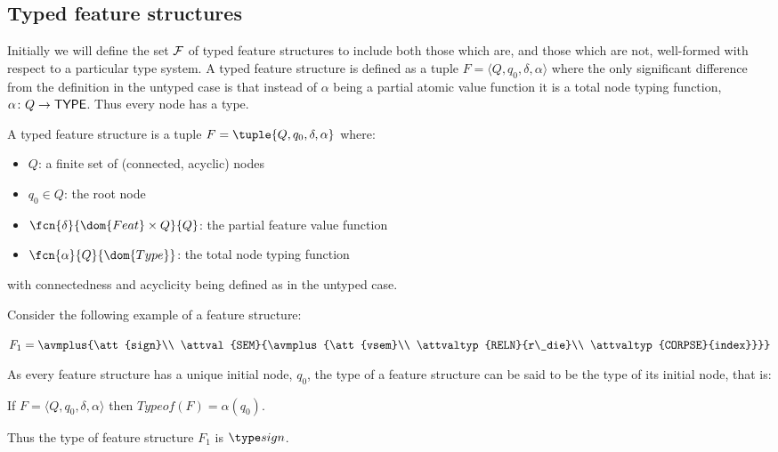 \documentclass[12pt]{report}
\begin{document}
\subsection{Typed feature structures}
\label{formtfs}

Initially we will 
define the set $\cal F$ of typed feature structures to include 
both those which are, and those which are not, well-formed with respect
to a particular type system.
A typed feature structure is defined as a tuple 
$F = \langle Q, q_{0}, \delta, \alpha \rangle$ 
where the only significant difference from the definition in the
untyped case 
is that instead of $\alpha$ being a partial atomic value function it is
a total node typing function, $\alpha\colon Q \rightarrow {\sf TYPE}$.  
Thus every node has a type.
\begin{definition}
A typed feature structure is a tuple $F =
\tuple{Q,q_{0},\delta,\alpha}$ where:
\begin{itemize}
\item
$Q$:  a finite set of (connected, acyclic) nodes 
\item
$q_{0} \in Q$: the root node
\item
$\fcn{\delta}{\dom{Feat} \times Q}{Q}$:  
the partial feature value function
\item
$\fcn{\alpha}{Q}{\dom{Type}}$: the total node typing function
\end{itemize}
with connectedness and acyclicity being defined as in the
untyped case.
\end{definition}

Consider the following example of a feature structure:
\begin{center}
{\tiny
   $F_{1}=\avmplus{\att{sign}\\
             \attval{SEM}{\avmplus{\att{vsem}\\
                                   \attvaltyp{RELN}{r\_die}\\
                                   \attvaltyp{CORPSE}{index}}}}$}
\end{center}
As every feature structure has a unique initial node, $q_{0}$, the
type of a feature structure can be said to be
the type of its initial node, that is: 
\begin{definition}
If $F = \langle Q, q_{0}, \delta, \alpha \rangle$ 
then $Typeof(F) = \alpha(q_{0})$. 
\end{definition}
Thus the type of feature structure $F_{1}$ is $\type sign$.  
\end{document}
